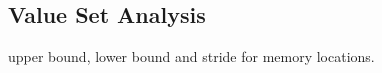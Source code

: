 

\subsection{Value Set Analysis}


upper bound, lower bound and stride for memory locations. \cite{wysinwyx}

